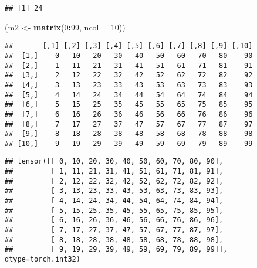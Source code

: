 \documentclass[]{book}
\newenvironment{Shaded}{\begin{snugshade}}{\end{snugshade}}
\newcommand{\DataTypeTok}[1]{\textcolor[rgb]{0.13,0.29,0.53}{#1}}
\newcommand{\DecValTok}[1]{\textcolor[rgb]{0.00,0.00,0.81}{#1}}
\newcommand{\KeywordTok}[1]{\textcolor[rgb]{0.13,0.29,0.53}{\textbf{#1}}}
\newcommand{\NormalTok}[1]{#1}
\newcommand{\OperatorTok}[1]{\textcolor[rgb]{0.81,0.36,0.00}{\textbf{#1}}}
\newcommand{\StringTok}[1]{\textcolor[rgb]{0.31,0.60,0.02}{#1}}
\begin{document}
\begin{Shaded}
\end{Shaded}

\begin{verbatim}
## [1] 24
\end{verbatim}

\begin{Shaded}
\begin{Highlighting}[]
\NormalTok{(m2 <-}\StringTok{ }\KeywordTok{matrix}\NormalTok{(}\DecValTok{0}\OperatorTok{:}\DecValTok{99}\NormalTok{, }\DataTypeTok{ncol =} \DecValTok{10}\NormalTok{))}
\end{Highlighting}
\end{Shaded}

\begin{verbatim}
##       [,1] [,2] [,3] [,4] [,5] [,6] [,7] [,8] [,9] [,10]
##  [1,]    0   10   20   30   40   50   60   70   80    90
##  [2,]    1   11   21   31   41   51   61   71   81    91
##  [3,]    2   12   22   32   42   52   62   72   82    92
##  [4,]    3   13   23   33   43   53   63   73   83    93
##  [5,]    4   14   24   34   44   54   64   74   84    94
##  [6,]    5   15   25   35   45   55   65   75   85    95
##  [7,]    6   16   26   36   46   56   66   76   86    96
##  [8,]    7   17   27   37   47   57   67   77   87    97
##  [9,]    8   18   28   38   48   58   68   78   88    98
## [10,]    9   19   29   39   49   59   69   79   89    99
\end{verbatim}

\begin{Shaded}
\end{Shaded}

\begin{verbatim}
## tensor([[ 0, 10, 20, 30, 40, 50, 60, 70, 80, 90],
##         [ 1, 11, 21, 31, 41, 51, 61, 71, 81, 91],
##         [ 2, 12, 22, 32, 42, 52, 62, 72, 82, 92],
##         [ 3, 13, 23, 33, 43, 53, 63, 73, 83, 93],
##         [ 4, 14, 24, 34, 44, 54, 64, 74, 84, 94],
##         [ 5, 15, 25, 35, 45, 55, 65, 75, 85, 95],
##         [ 6, 16, 26, 36, 46, 56, 66, 76, 86, 96],
##         [ 7, 17, 27, 37, 47, 57, 67, 77, 87, 97],
##         [ 8, 18, 28, 38, 48, 58, 68, 78, 88, 98],
##         [ 9, 19, 29, 39, 49, 59, 69, 79, 89, 99]], dtype=torch.int32)
\end{verbatim}
\end{document}
